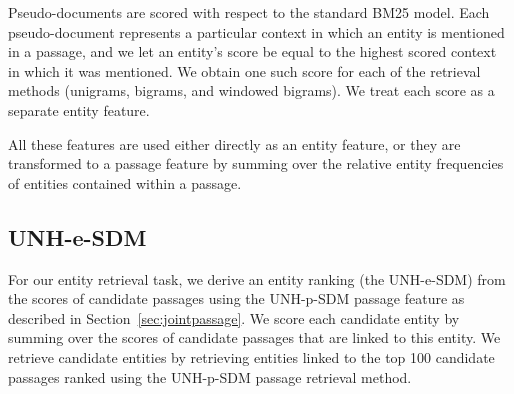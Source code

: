 \documentclass{article}
\begin{document}
Pseudo-documents are scored with respect to the standard BM25 model.
Each pseudo-document represents a particular context in which an entity is mentioned in a passage, and we let an entity's score be equal to the highest scored context in which it was mentioned. We obtain one such score for each of the retrieval methods (unigrams, bigrams, and windowed bigrams). We treat each score as a separate entity feature.

\smallskip
All these features are used either directly as an entity feature, or they are transformed to a passage feature by summing over the relative entity frequencies of entities contained within a passage. 


\subsection{UNH-e-SDM}\label{sec:esdm}

For our entity retrieval task, we derive an entity ranking (the UNH-e-SDM) from the scores of candidate passages using the UNH-p-SDM passage feature as described in Section~\ref{sec:jointpassage}. We score each candidate entity by summing over the scores of candidate passages that are linked to this entity. We retrieve candidate entities by retrieving entities linked to the top 100 candidate passages ranked using the UNH-p-SDM passage retrieval method. 

%
%
\end{document}
